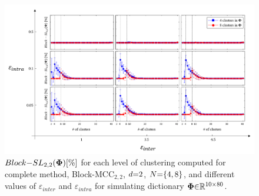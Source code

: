 \begin{figure}[!b]
\centering
\includegraphics[width=1\textwidth,keepaspectratio]{images/SL_Hierarchical.png} %
\centering
\caption{$Block{-}SL_{2,2}(\boldsymbol{\Phi})[\%]$ for each level of clustering computed for complete method, Block-MCC$_{2,2}$, $d {=} 2$, $N {=} \{ 4 , 8\}$, and different values of $\varepsilon_{inter}$ and $\varepsilon_{intra}$ for simulating dictionary $\boldsymbol{\Phi} {\in} \mathbb{R}^{10 {\times} 80}$.}
\label{fig:SL_Hierarchical}
\end{figure}